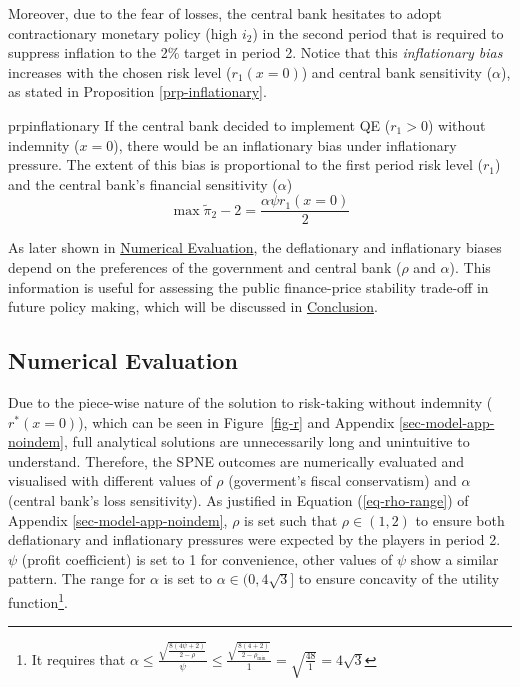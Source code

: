 \documentclass[
  a4paper,
  abstract=true]{scrartcl}
\theoremstyle{definition}
\begin{document}
Moreover, due to the fear of losses, the central bank hesitates to adopt
contractionary monetary policy (high \(i_2\)) in the second period that
is required to suppress inflation to the 2\% target in period 2. Notice
that this \emph{inflationary bias} increases with the chosen risk level
(\(r_1(x=0)\)) and central bank sensitivity (\(\alpha\)), as stated in
Proposition \ref{prp-inflationary}.

\begin{restatable}{prp}{inflationary}
\label{prp-inflationary}
If the central bank decided to implement QE ($r_1>0$) without indemnity ($x=0$),
there would be an inflationary bias under inflationary pressure. The extent of this bias is proportional to the first period risk level ($r_1$) and the central bank's financial sensitivity ($\alpha$)
$$
\max\tilde\pi_2-2=\frac{\alpha\psi r_1(x=0)}{2}
$$
\end{restatable}

As later shown in \hyperref[sec-simulation]{Numerical Evaluation}, the
deflationary and inflationary biases depend on the preferences of the
government and central bank (\(\rho\) and \(\alpha\)). This information
is useful for assessing the public finance-price stability trade-off in
future policy making, which will be discussed in
\hyperref[sec-conclusion]{Conclusion}.

\subsection{Numerical Evaluation}\label{sec-simulation}

Due to the piece-wise nature of the solution to risk-taking without
indemnity (\(r^*(x=0)\)), which can be seen in Figure~\ref{fig-r} and
Appendix \ref{sec-model-app-noindem}, full analytical solutions are
unnecessarily long and unintuitive to understand. Therefore, the SPNE
outcomes are numerically evaluated and visualised with different values
of \(\rho\) (goverment's fiscal conservatism) and \(\alpha\) (central
bank's loss sensitivity). As justified in Equation (\ref{eq-rho-range})
of Appendix \ref{sec-model-app-noindem}, \(\rho\) is set such that
\(\rho\in(1,2)\) to ensure both deflationary and inflationary pressures
were expected by the players in period 2. \(\psi\) (profit coefficient)
is set to 1 for convenience, other values of \(\psi\) show a similar
pattern. The range for \(\alpha\) is set to \(\alpha\in(0,4\sqrt3]\) to
ensure concavity of the utility function\footnote{It requires that
  \(\alpha\leq\frac{\sqrt{\frac{8(4\psi+2)}{2-\rho}}}{\psi}\leq\frac{\sqrt{\frac{8(4+2)}{2-\rho_{\min} }}}{1}=\sqrt{\frac{48}{1}}=4\sqrt3\)}.
\end{document}
